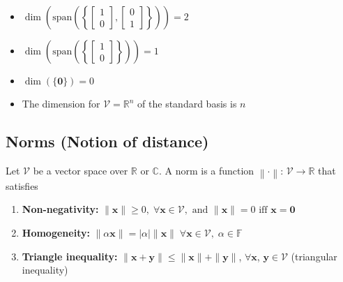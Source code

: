 \begin{example}
    \begin{itemize}
        \item \( \dim \left( \text{span} \left( \left\{ \begin{bmatrix} 1 \\ 0 \end{bmatrix}, \begin{bmatrix} 0 \\ 1 \end{bmatrix} \right\} \right) \right) = 2 \)
        
        \item \( \dim \left( \text{span} \left( \left\{ \begin{bmatrix} 1 \\ 0 \end{bmatrix} \right\} \right) \right) = 1 \)
        
        \item \( \dim \left( \{ \mathbf{0} \} \right) = 0 \)
        \item The dimension for $\mathcal{V}=\mathbb{R}^n$ of the standard basis is $n$
    \end{itemize}
\end{example}

\subsection{Norms (Notion of distance)}
\begin{definition}
    Let $\mathcal{V}$ be a vector space over $\mathbb{R}$ or $\mathbb{C}$. A norm is a function $\left\lVert \cdot \right\rVert$: $\mathcal{V} \rightarrow \mathbb{R}$ that satisfies 
    \begin{enumerate}
        \item \textbf{Non-negativity:} \( \| \mathbf{x} \| \geq 0, \; \forall \mathbf{x} \in \mathcal{V}, \text{ and } \| \mathbf{x} \| = 0 \text{ iff } \mathbf{x} = \mathbf{0} \)
        \item \textbf{Homogeneity:} \( \| \alpha \mathbf{x} \| = |\alpha| \| \mathbf{x} \| \; \forall \mathbf{x} \in \mathcal{V}, \; \alpha \in \mathbb{F} \)
        \item \textbf{Triangle inequality:} \( \| \mathbf{x} + \mathbf{y} \| \leq \| \mathbf{x} \| + \| \mathbf{y} \| \), $\forall \mathbf{x}$, $\mathbf{y}\in \mathcal{V}$ (triangular inequality)
    \end{enumerate}
\end{definition}

